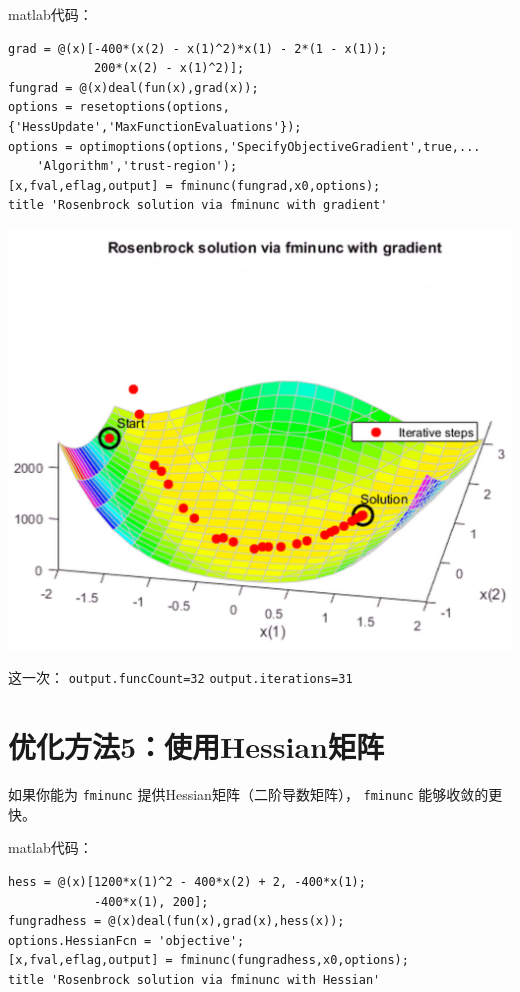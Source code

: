 \documentclass[10pt,a4paper,UTF8]{article}
\begin{document}
matlab代码：
\lstset{language=matlab,label= ,caption= ,captionpos=b,numbers=none}
\begin{lstlisting}
grad = @(x)[-400*(x(2) - x(1)^2)*x(1) - 2*(1 - x(1));
            200*(x(2) - x(1)^2)];
fungrad = @(x)deal(fun(x),grad(x));
options = resetoptions(options,{'HessUpdate','MaxFunctionEvaluations'});
options = optimoptions(options,'SpecifyObjectiveGradient',true,...
    'Algorithm','trust-region');
[x,fval,eflag,output] = fminunc(fungrad,x0,options);
title 'Rosenbrock solution via fminunc with gradient'
\end{lstlisting}


\begin{center}
\includegraphics[width=.9\linewidth]{../../img/communication_matlab/20171014rosenbrockfminunc3.png}
\end{center}

这一次： \texttt{output.funcCount=32} \texttt{output.iterations=31}
\section{优化方法5：使用Hessian矩阵}
\label{sec:org9248df7}


如果你能为 \texttt{fminunc} 提供Hessian矩阵（二阶导数矩阵）， \texttt{fminunc} 能够收敛的更快。


matlab代码：
\lstset{language=matlab,label= ,caption= ,captionpos=b,numbers=none}
\begin{lstlisting}
hess = @(x)[1200*x(1)^2 - 400*x(2) + 2, -400*x(1);
            -400*x(1), 200];
fungradhess = @(x)deal(fun(x),grad(x),hess(x));
options.HessianFcn = 'objective';
[x,fval,eflag,output] = fminunc(fungradhess,x0,options);
title 'Rosenbrock solution via fminunc with Hessian'
\end{lstlisting}
\end{document}
